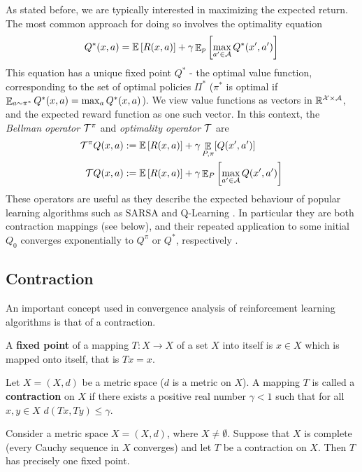 As stated before, we are typically interested in maximizing the expected return. The most common approach for doing so involves the optimality equation
\begin{equation}
Q^*(x,a) = \mathbb{E}\left[ {R(x,a)} \right] + \gamma \mathop{\mathbb{E}}\nolimits_p \left[ {\max_{a' \in \mathcal{A}} Q^*(x', a')} \right]
\end{equation}
This equation has a unique fixed point $Q^*$ -  the optimal value function, corresponding to the set of optimal policies $\Pi^*$ ($\pi^*$ is optimal if $\mathop{\mathbb{E}}_{a \sim \pi^*} Q^*(x, a) = \max_a Q^*(x,a)$).
We view value functions as vectors in $\mathbb{R}^{\mathcal{X} \times \mathcal{A}}$, and the expected reward function as one such vector. In this context, the \emph{Bellman operator} $\mathcal{T}^\pi$ and \emph{optimality operator} $\mathcal{T}$ are
\begin{align}
\mathcal{T}^\pi Q(x,a) &:= \mathbb{E}\left[ { R(x, a)} \right] + \gamma \mathop{\mathbb{E}}_{P, \pi} [Q(x',a')]\\
\mathcal{T} Q(x,a) &:= \mathbb{E}\left[ { R(x, a)} \right] + \gamma \mathop{\mathbb{E}}\nolimits_{P} \left[ {\max_{a' \in \mathcal{A}}Q(x', a')} \right]\label{eqn:bellmanoptimalityoperator}
\end{align}
These operators are useful as they describe the expected behaviour of popular learning algorithms such as SARSA and Q-Learning \cite{sutton1998reinforcement}. In particular they are both contraction mappings (see below), and their repeated application to some initial $Q_0$ converges exponentially to $Q^\pi$ or $Q^*$, respectively \citep{bertsekas1995neuro}.

\subsection{Contraction}
An important concept used in convergence analysis of reinforcement learning algorithms is that of a contraction.
\begin{definition}
A \textbf{fixed point} of a mapping $T: X\to X$ of a set $X$ into itself is $x\in X$ which is mapped onto itself, that is $Tx=x$.

Let $X=(X,d)$ be a metric space ($d$ is a metric on $X$). A mapping $T$ is called a \textbf{contraction} on $X$ if there exists a positive real number $\gamma < 1$ such that for all $x, y \in X$ $d(Tx, Ty) \le \gamma$.
\end{definition}

\begin{theorem}
Consider a metric space $X=(X,d)$, where $X \neq \emptyset$. Suppose that $X$ is complete (every Cauchy sequence in $X$ converges) and let $T$ be a contraction on $X$. Then $T$ has precisely one fixed point.
\end{theorem}

